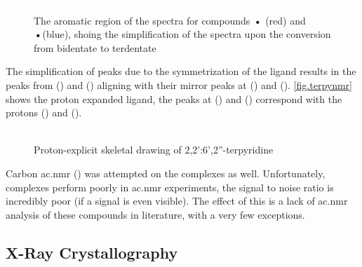 \begin{figure}[!htbp]
 \begin{center}
  \includegraphics[clip=true]{images/insertgraphic.eps}
 \end{center}
\caption[The aromatic region of the \texorpdfstring{}{1H} spectra showing bidentate - terdentate conversion]{The aromatic region of the \texorpdfstring{}{1H} spectra for compounds \textbf{•} (red) and \textbf{•}(blue), shoing the simplification of the spectra upon the conversion from bidentate to terdentate}
\label{fig.bidtoter}
\end{figure} 

The simplification of peaks due to the symmetrization of the ligand results in the peaks from () and () aligning with their mirror peaks at () and (). \autoref{fig.terpynmr} shows the proton expanded ligand, the peaks at () and () correspond with the protons () and (). 

\begin{figure}[!htbp]
 \begin{center}
  \includegraphics[clip=true]{images/insertgraphic.eps}
 \end{center}
\caption[Proton-explicit skeletal drawing of 2,2':6',2''-terpyridine]{Proton-explicit skeletal drawing of 2,2':6',2''-terpyridine}
\label{fig.termpynmr}
\end{figure} 

Carbon \gls{ac.nmr} () was attempted on the complexes as well. Unfortunately,  complexes perform poorly in  \gls{ac.nmr} experiments, the signal to noise ratio is incredibly poor (if a signal is even visible). The effect of this is a lack of  \gls{ac.nmr} analysis of these compounds in literature, with a very few exceptions. 

\subsection{X-Ray Crystallography}

